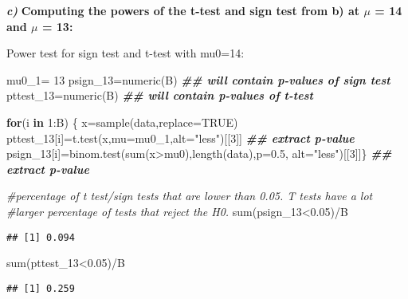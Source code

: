 \documentclass[
]{article}
\newenvironment{Shaded}{\begin{snugshade}}{\end{snugshade}}
\newcommand{\AttributeTok}[1]{\textcolor[rgb]{0.77,0.63,0.00}{#1}}
\newcommand{\CommentTok}[1]{\textcolor[rgb]{0.56,0.35,0.01}{\textit{#1}}}
\newcommand{\ConstantTok}[1]{\textcolor[rgb]{0.00,0.00,0.00}{#1}}
\newcommand{\ControlFlowTok}[1]{\textcolor[rgb]{0.13,0.29,0.53}{\textbf{#1}}}
\newcommand{\DecValTok}[1]{\textcolor[rgb]{0.00,0.00,0.81}{#1}}
\newcommand{\DocumentationTok}[1]{\textcolor[rgb]{0.56,0.35,0.01}{\textbf{\textit{#1}}}}
\newcommand{\FloatTok}[1]{\textcolor[rgb]{0.00,0.00,0.81}{#1}}
\newcommand{\FunctionTok}[1]{\textcolor[rgb]{0.00,0.00,0.00}{#1}}
\newcommand{\NormalTok}[1]{#1}
\newcommand{\OtherTok}[1]{\textcolor[rgb]{0.56,0.35,0.01}{#1}}
\newcommand{\SpecialCharTok}[1]{\textcolor[rgb]{0.00,0.00,0.00}{#1}}
\newcommand{\StringTok}[1]{\textcolor[rgb]{0.31,0.60,0.02}{#1}}
\begin{document}
\textbf{\emph{c)}} \textbf{Computing the powers of the t-test and sign
test from b) at \(\mu\) = 14 and \(\mu\) = 13:}

Power test for sign test and t-test with mu0=14:

\begin{Shaded}
\begin{Highlighting}[]
\NormalTok{mu0\_1}\OtherTok{=} \DecValTok{13}
\NormalTok{psign\_13}\OtherTok{=}\FunctionTok{numeric}\NormalTok{(B) }\DocumentationTok{\#\# will contain p{-}values of sign test}
\NormalTok{pttest\_13}\OtherTok{=}\FunctionTok{numeric}\NormalTok{(B) }\DocumentationTok{\#\# will contain p{-}values of t{-}test}

\ControlFlowTok{for}\NormalTok{(i }\ControlFlowTok{in} \DecValTok{1}\SpecialCharTok{:}\NormalTok{B) \{}
\NormalTok{   x}\OtherTok{=}\FunctionTok{sample}\NormalTok{(data,}\AttributeTok{replace=}\ConstantTok{TRUE}\NormalTok{)}
\NormalTok{   pttest\_13[i]}\OtherTok{=}\FunctionTok{t.test}\NormalTok{(x,}\AttributeTok{mu=}\NormalTok{mu0\_1,}\AttributeTok{alt=}\StringTok{"less"}\NormalTok{)[[}\DecValTok{3}\NormalTok{]] }\DocumentationTok{\#\# extract p{-}value}
\NormalTok{   psign\_13[i]}\OtherTok{=}\FunctionTok{binom.test}\NormalTok{(}\FunctionTok{sum}\NormalTok{(x}\SpecialCharTok{\textgreater{}}\NormalTok{mu0),}\FunctionTok{length}\NormalTok{(data),}\AttributeTok{p=}\FloatTok{0.5}\NormalTok{, }\AttributeTok{alt=}\StringTok{"less"}\NormalTok{)[[}\DecValTok{3}\NormalTok{]]\} }\DocumentationTok{\#\# extract p{-}value}

\CommentTok{\#percentage of t test/sign tests that are lower than 0.05. T tests have a lot}
\CommentTok{\#larger percentage of tests that reject the H0.}
\FunctionTok{sum}\NormalTok{(psign\_13}\SpecialCharTok{\textless{}}\FloatTok{0.05}\NormalTok{)}\SpecialCharTok{/}\NormalTok{B}
\end{Highlighting}
\end{Shaded}

\begin{verbatim}
## [1] 0.094
\end{verbatim}

\begin{Shaded}
\begin{Highlighting}[]
\FunctionTok{sum}\NormalTok{(pttest\_13}\SpecialCharTok{\textless{}}\FloatTok{0.05}\NormalTok{)}\SpecialCharTok{/}\NormalTok{B}
\end{Highlighting}
\end{Shaded}

\begin{verbatim}
## [1] 0.259
\end{verbatim}
\end{document}

